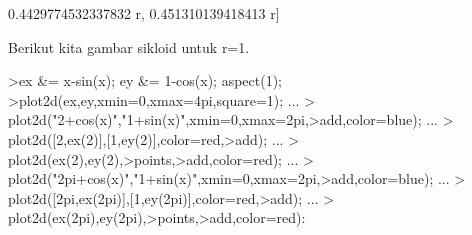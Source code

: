 \documentclass[a4paper,10pt]{article}
\begin{document}
\begin{eulernotebook}
\begin{eulercomment}
\begin{eulercomment}
\begin{eulercomment}
\begin{eulercomment}
\begin{eulercomment}
\begin{eulercomment}
\begin{eulercomment}
\begin{eulercomment}
\begin{eulercomment}
\begin{eulercomment}
\begin{eulercomment}
\begin{eulercomment}
\begin{eulercomment}
\begin{eulercomment}
\begin{eulercomment}
\begin{eulercomment}
\begin{euleroutput}
  0.4429774532337832 r, 0.451310139418413 r]
  
\end{euleroutput}
\begin{eulercomment}
Berikut kita gambar sikloid untuk r=1.
\end{eulercomment}
\begin{eulerprompt}
>ex &= x-sin(x); ey &= 1-cos(x); aspect(1);
>plot2d(ex,ey,xmin=0,xmax=4pi,square=1); ...
>  plot2d("2+cos(x)","1+sin(x)",xmin=0,xmax=2pi,>add,color=blue); ...
>  plot2d([2,ex(2)],[1,ey(2)],color=red,>add); ...
>  plot2d(ex(2),ey(2),>points,>add,color=red); ...
>  plot2d("2pi+cos(x)","1+sin(x)",xmin=0,xmax=2pi,>add,color=blue); ...
>  plot2d([2pi,ex(2pi)],[1,ey(2pi)],color=red,>add);  ...
>  plot2d(ex(2pi),ey(2pi),>points,>add,color=red):
\end{eulerprompt}
\begin{euleroutput}

\end{euleroutput}
\end{eulercomment}
\end{eulercomment}
\end{eulercomment}
\end{eulercomment}
\end{eulercomment}
\end{eulercomment}
\end{eulercomment}
\end{eulercomment}
\end{eulercomment}
\end{eulercomment}
\end{eulercomment}
\end{eulercomment}
\end{eulercomment}
\end{eulercomment}
\end{eulercomment}
\end{eulercomment}
\end{eulernotebook}
\end{document}

